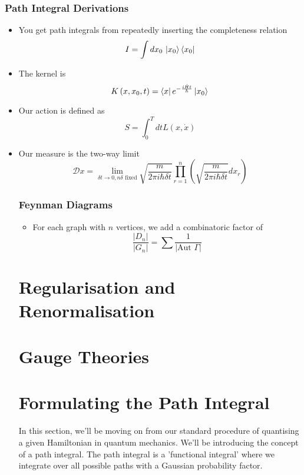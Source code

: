 \documentclass[11pt, oneside]{article}   	%
\theoremstyle{slanted}
\newcommand{\planck}{\hbar}
\begin{document}
\subsubsection{Path Integral Derivations}
\begin{itemize}
	\item You get path integrals from repeatedly inserting 
		the completeness relation 
		\[
		 I = \int dx_0 \, \ket{x_0 }\bra{ x_0 } 
		\]
	\item The kernel is 
		\[
		 K \left( x, x_0 ,t   \right)   = \bra{x}e^{ -\frac{i \hat{H } t }{ \planck}}\ket{ x_0}
		\] 
	\item Our action is defined as 
		\[
			S  = \int_{ 0 } ^ T dt L \left(  x , \dot{ x }  \right) 
		\] 
	\item Our measure is the two-way limit 
		\[
			\mathcal{ D } x  = \lim_{ \delta t \to 0 , n \delta \text{ fixed}} 
			\sqrt{\frac{m}{ 2 \pi i \planck \delta t } }  \prod_{ r  = 1 } ^ n 
			\left( \sqrt{  \frac{m  }{2 \pi i \planck \delta t  }} dx _r  \right) 
		\]  
\subsubsection{Feynman Diagrams}
\begin{itemize}
	\item For each graph with $ n $ vertices, we add a combinatoric factor of 
		\[
		 \frac{| D _ n |  }{ | G _ n  | }  = \sum \frac{1}{ | \text{Aut } \Gamma | }
		\] 
\end{itemize}

\section{Regularisation and Renormalisation}%
\label{sec:regularisation_and_renormalisation}

\section{Gauge Theories}%
\label{sec:gauge_theories}


\section{Formulating the Path Integral} 

In this section, we'll be moving on from 
our standard procedure of quantising a given Hamiltonian 
in quantum mechanics. We'll be introducing 
the concept of a path integral. The path integral 
is a 'functional integral' where we integrate over 
all possible paths with a Gaussian probability factor.


\end{itemize}
\end{document}
